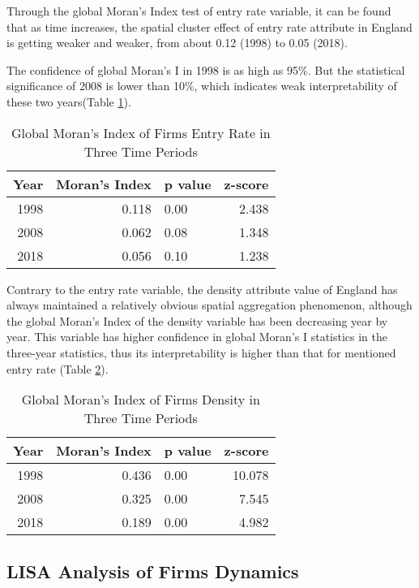 \documentclass[
  12pt,
  oneside]{book}
\begin{document}
Through the global Moran's Index test of entry rate variable, it can be found that as time increases, the spatial cluster effect of entry rate attribute in England is getting weaker and weaker, from about 0.12 (1998) to 0.05 (2018).

The confidence of global Moran's I in 1998 is as high as 95\%. But the statistical significance of 2008 is lower than 10\%, which indicates weak interpretability of these two years(Table \ref{tab:tab-morans-i-enR}).

\begin{table}

\caption{\label{tab:tab-morans-i-enR}Global Moran's Index of Firms Entry Rate in Three Time Periods}
\centering
\begin{tabular}[t]{rrlr}
\toprule
\textbf{Year} & \textbf{Moran’s Index} & \textbf{p value} & \textbf{z-score}\\
\midrule
1998 & 0.118 & 0.00 & 2.438\\
2008 & 0.062 & 0.08 & 1.348\\
2018 & 0.056 & 0.10 & 1.238\\
\bottomrule
\end{tabular}
\end{table}

Contrary to the entry rate variable, the density attribute value of England has always maintained a relatively obvious spatial aggregation phenomenon, although the global Moran's Index of the density variable has been decreasing year by year. This variable has higher confidence in global Moran's I statistics in the three-year statistics, thus its interpretability is higher than that for mentioned entry rate (Table \ref{tab:tab-morans-i-den}).

\begin{table}

\caption{\label{tab:tab-morans-i-den}Global Moran's Index of Firms Density in Three Time Periods}
\centering
\begin{tabular}[t]{rrlr}
\toprule
\textbf{Year} & \textbf{Moran’s Index} & \textbf{p value} & \textbf{z-score}\\
\midrule
1998 & 0.436 & 0.00 & 10.078\\
2008 & 0.325 & 0.00 & 7.545\\
2018 & 0.189 & 0.00 & 4.982\\
\bottomrule
\end{tabular}
\end{table}

\hypertarget{lisa-analysis-of-firms-dynamics}{%
\subsection{LISA Analysis of Firms Dynamics}\label{lisa-analysis-of-firms-dynamics}}
\end{document}
